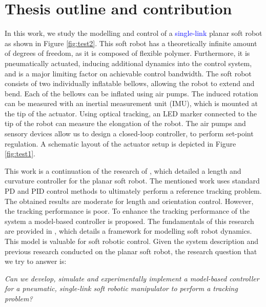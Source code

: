 \section*{Thesis outline and contribution}

In this work, we study the modelling and control of a \textcolor{blue}{single-link} planar soft robot as shown in Figure \ref{fig:test2}. This soft robot has a theoretically infinite amount of degrees of freedom, as it is composed of flexible polymer. Furthermore, it is pneumatically actuated, inducing additional dynamics into the control system, and is a major limiting factor on achievable control bandwidth. The soft robot consists of two individually inflatable bellows, allowing the robot to extend and bend. Each of the bellows can be inflated using air pumps. The induced rotation can be measured with an inertial measurement unit (IMU), which is mounted at the tip of the actuator. Using optical tracking, an LED marker connected to the tip of the robot can measure the elongation of the robot. The air pumps and sensory devices allow us to design a closed-loop controller, to perform set-point regulation. A schematic layout of the actuator setup is depicted in Figure \ref{fig:test1}.

This work is a continuation of the research of \cite{berkers}, which detailed a length and curvature controller for the planar soft robot. The mentioned work uses standard PD and PID control methods to ultimately perform a reference tracking problem. The obtained results are moderate for length and orientation control. However, the tracking performance is poor. To enhance the tracking performance of the system a model-based controller is proposed. The fundamentals of this research are provided in \cite{Caasenbrood2020}, which details a framework for modelling soft robot dynamics. This model is valuable for soft robotic control. Given the system description and previous research conducted on the planar soft robot, the research question that we try to answer is:

\textit{Can we develop, simulate and experimentally implement a model-based controller for a pneumatic, single-link soft robotic manipulator to perform a tracking problem?}

